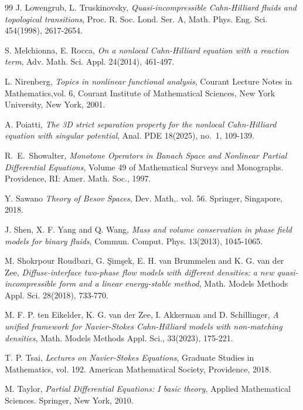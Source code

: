 \documentclass[reqno,a4paper,11pt]{amsart}
\theoremstyle{plain}
\numberwithin{equation}{section}
\begin{document}
\begin{thebibliography}{99}
	 J. Lowengrub, L. Truskinovsky, \textit{Quasi-incompressible Cahn-Hilliard fluids and topological transitions}, Proc. R. Soc. Lond.
	Ser. A, Math. Phys. Eng. Sci. 454(1998), 2617-2654.
	
	 S. Melchionna, E. Rocca, \textit{On a nonlocal Cahn-Hilliard equation with a reaction term}, Adv. Math. Sci. Appl. 24(2014), 461-497.
	
	 L. Nirenberg, \textit{Topics in nonlinear functional analysis},  Courant Lecture Notes in Mathematics,vol. 6, Courant Institute of Mathematical Sciences, New York University, New York, 2001.
	
	 A. Poiatti, \textit{The 3D strict separation property for the nonlocal Cahn-Hilliard equation with singular potential}, Anal. PDE 18(2025), no.~1, 109-139.
	
	 R.~E.~Showalter, \textit{Monotone Operators in Banach Space and Nonlinear Partial Differential Equations}, Volume 49 of Mathematical Surveys and Monographs. Providence, RI: Amer. Math. Soc., 1997.
	
	 Y. Sawano \textit{Theory of Besov Spaces}, Dev. Math,. vol. 56. Springer, Singapore, 2018.
	
	J. Shen, X. F. Yang and Q. Wang, \textit{Mass and volume conservation in phase field models for binary fluids},
	Commun. Comput. Phys. 13(2013), 1045-1065.	
	
	 M. Shokrpour Roudbari, G. \c{S}im\c{s}ek, E. H. van Brummelen and  K. G. van der Zee, \textit{ Diffuse-interface two-phase flow models with different densities: a new quasi-incompressible form and a linear energy-stable method},
	Math. Models Methods Appl. Sci. 28(2018), 733-770.
	
	 M. F. P. ten Eikelder, K. G. van der Zee, I. Akkerman and D. Schillinger, \textit{A unified framework for Navier-Stokes Cahn-Hilliard models with non-matching densities},
	Math. Models Methods Appl. Sci., 33(2023), 175-221.
	
	 T. P. Tsai, \textit{Lectures on Navier-Stokes Equations},  Graduate Studies in Mathematics, vol. 192. American Mathematical Society, Providence, 2018.
	
	 M. Taylor, \textit{Partial Differential Equations: I basic theory}, Applied Mathematical Sciences. Springer, New York, 2010.
\end{thebibliography}
\end{document}
